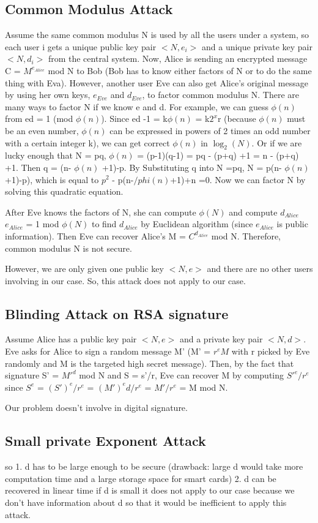 \documentclass[12pt]{article} %
\begin{document}
\subsection{ Common Modulus Attack}
		Assume the same common modulus N is used by all the users under a system, so each user i gets a unique public key pair $<N,e_i>$ and a unique private key pair $<N,d_i>$ from the central system.
		Now, Alice is sending an encrypted message C = $M^{e_{Alice}}$ mod N to Bob (Bob has to know either factors of N or to do the same thing with Eva). 
		However, another user Eve can also get Alice's original message by using her own keys, ${e_{Eve}}$ and ${d_{Eve}}$, to factor common modulus N. There are many ways to factor N if we know e and d.
		For example, we can guess $\phi(n)$  from ed = 1 (mod $\phi(n)$). Since ed -1 = k$\phi(n)$ = k$2^x$r (because $\phi(n)$ must be an even number, $\phi(n)$ can be expressed in powers of 2 times an odd number with a certain integer k),
		we can get correct $\phi(n)$ in $\log_2(N)$.
		Or if we are lucky enough that N = pq, $\phi(n)$ = (p-1)(q-1) = pq - (p+q) +1 = n - (p+q) +1. Then q = (n- $\phi(n)$ +1)-p. By Substituting q into N =pq, N = p(n- $\phi(n)$ +1)-p), which is equal to $p^2$ - p(n-$/phi(n)$+1)+n =0.
		Now we can factor N by solving this quadratic equation.
		
		After Eve knows the factors of N, she can compute $\phi(N)$ and compute ${d_{Alice}}$ ${e_{Alice}}$ = 1 mod $\phi(N)$ to find ${d_{Alice}}$ by Euclidean algorithm (since ${e_{Alice}}$ is public information).
		Then Eve can recover Alice's M = $C^{d_{Alice}}$ mod N.
		Therefore, common modulus N is not secure.

		However, we are only given one public key $<N,e>$ and there are no other users involving in our case. So, this attack does not apply to our case. 
\subsection{Blinding Attack on RSA signature}
		Assume Alice has a public key pair $<N,e>$ and a private key pair $<N,d>$. Eve asks for Alice to sign a random message M' (M' = $r^eM$ with r picked by Eve randomly and M is the targeted high secret message).
		Then, by the fact that signature S' = $M'^d$ mod N and S = s'/r, Eve can recover M by computing $S'^e/r^e$ since $S^e$ = $(S')^e/r^e$ = $(M')^ed / r^e$ = $M'/r^e$ = M mod N.
		
		Our problem doesn't involve in digital signature.
\subsection{Small private Exponent Attack}
		so
		1. d has to be large enough to be secure (drawback: large d would take more computation time and a large storage space for smart cards)
		2. d can be recovered in linear time if d is small
		it does not apply to our case because we don't have information about d so that it would be inefficient to apply this attack.
\end{document}
